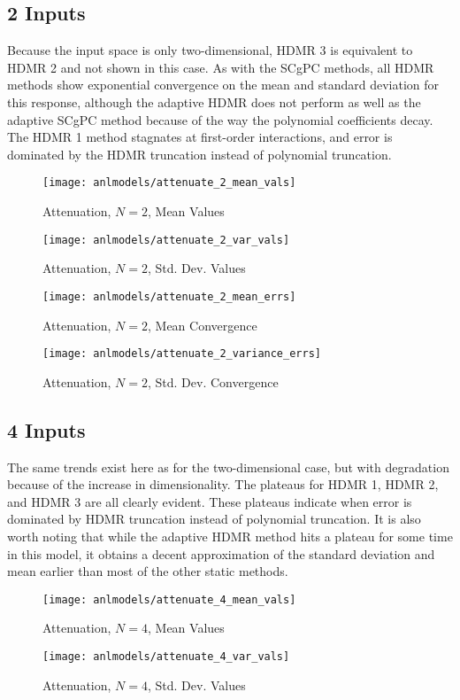 \subsection{2 Inputs}
Because the input space is only two-dimensional, HDMR 3 is equivalent to HDMR 2 and not shown in this case.
As with the SCgPC methods, all HDMR methods show exponential convergence on the mean and standard deviation
for this response, although the adaptive HDMR does not perform as well as the adaptive SCgPC method because of
the way the polynomial coefficients decay.  The HDMR 1 method stagnates at first-order interactions, and
error is dominated by the HDMR truncation instead of polynomial truncation.
\begin{figure}[H]
  \centering
  \texttt{[image: anlmodels/attenuate\_2\_mean\_vals]}
  \caption{Attenuation, $N=2$, Mean Values}
  \label{fig:hdmr attenuate mean values 2}
\end{figure}
\begin{figure}[H]
  \centering
  \texttt{[image: anlmodels/attenuate\_2\_var\_vals]}
  \caption{Attenuation, $N=2$, Std. Dev. Values}
  \label{fig:hdmr attenuate var values 2}
\end{figure}

\begin{figure}[H]
  \centering
  \texttt{[image: anlmodels/attenuate\_2\_mean\_errs]}
  \caption{Attenuation, $N=2$, Mean Convergence}
  \label{fig:hdmr attenuate mean errors 2}
\end{figure}
\begin{figure}[H]
  \centering
  \texttt{[image: anlmodels/attenuate\_2\_variance\_errs]}
  \caption{Attenuation, $N=2$, Std. Dev. Convergence}
  \label{fig:hdmr attenuate var errors 2}
\end{figure}


\subsection{4 Inputs}
The same trends exist here as for the two-dimensional case, but with degradation because of the increase in
dimensionality.  The plateaus for HDMR 1, HDMR 2, and HDMR 3 are all clearly evident.  These plateaus indicate
when error is dominated by HDMR truncation instead of polynomial truncation.  It is also worth noting that
while the adaptive HDMR method hits a plateau for some time in this model, it obtains a decent approximation
of the standard deviation and mean earlier than most of the other static methods.
\begin{figure}[H]
  \centering
  \texttt{[image: anlmodels/attenuate\_4\_mean\_vals]}
  \caption{Attenuation, $N=4$, Mean Values}
  \label{fig:hdmr attenuate mean values 4}
\end{figure}
\begin{figure}[H]
  \centering
  \texttt{[image: anlmodels/attenuate\_4\_var\_vals]}
  \caption{Attenuation, $N=4$, Std. Dev. Values}
  \label{fig:hdmr attenuate var values 4}
\end{figure}

